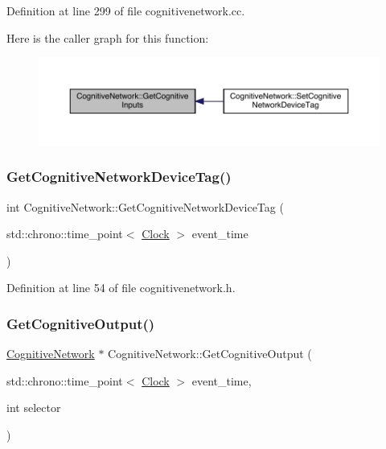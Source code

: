 Definition at line 299 of file cognitivenetwork.\+cc.

Here is the caller graph for this function\+:
\nopagebreak
\begin{figure}[H]
\begin{center}
\leavevmode
\includegraphics[width=350pt]{class_cognitive_network_a92b896643b881e4030401e0f7fd256bf_icgraph}
\end{center}
\end{figure}
\mbox{\label{class_cognitive_network_af33f3ff9dd829da73d183d2624f24964}} 
\subsubsection{\texorpdfstring{Get\+Cognitive\+Network\+Device\+Tag()}{GetCognitiveNetworkDeviceTag()}}
{\footnotesize\ttfamily int Cognitive\+Network\+::\+Get\+Cognitive\+Network\+Device\+Tag (\begin{DoxyParamCaption}\item[{std\+::chrono\+::time\+\_\+point$<$ \hyperlink{universe_8h_a0ef8d951d1ca5ab3cfaf7ab4c7a6fd80}{Clock} $>$}]{event\+\_\+time }\end{DoxyParamCaption})\hspace{0.3cm}{\ttfamily [inline]}}



Definition at line 54 of file cognitivenetwork.\+h.

\mbox{\label{class_cognitive_network_a947fa4c50fecc4008d2bcfc96a272ffc}} 
\subsubsection{\texorpdfstring{Get\+Cognitive\+Output()}{GetCognitiveOutput()}}
{\footnotesize\ttfamily \hyperlink{class_cognitive_network}{Cognitive\+Network} $\ast$ Cognitive\+Network\+::\+Get\+Cognitive\+Output (\begin{DoxyParamCaption}\item[{std\+::chrono\+::time\+\_\+point$<$ \hyperlink{universe_8h_a0ef8d951d1ca5ab3cfaf7ab4c7a6fd80}{Clock} $>$}]{event\+\_\+time,  }\item[{int}]{selector }\end{DoxyParamCaption})}



